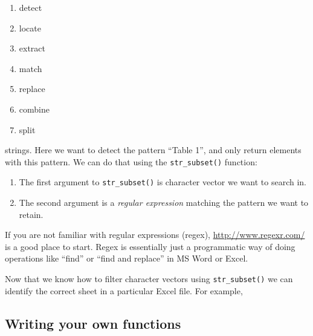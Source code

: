 \documentclass[
]{book}
\newenvironment{Shaded}{\begin{snugshade}}{\end{snugshade}}
\newcommand{\CommentTok}[1]{\textcolor[rgb]{0.56,0.35,0.01}{\textit{#1}}}
\newcommand{\DataTypeTok}[1]{\textcolor[rgb]{0.13,0.29,0.53}{#1}}
\newcommand{\DecValTok}[1]{\textcolor[rgb]{0.00,0.00,0.81}{#1}}
\newcommand{\KeywordTok}[1]{\textcolor[rgb]{0.13,0.29,0.53}{\textbf{#1}}}
\newcommand{\NormalTok}[1]{#1}
\newcommand{\OperatorTok}[1]{\textcolor[rgb]{0.81,0.36,0.00}{\textbf{#1}}}
\newcommand{\StringTok}[1]{\textcolor[rgb]{0.31,0.60,0.02}{#1}}
\providecommand{\tightlist}{%
  \setlength{\itemsep}{0pt}\setlength{\parskip}{0pt}}
\begin{document}
\begin{enumerate}
\def\labelenumi{\arabic{enumi}.}
\tightlist
\item
  detect
\item
  locate
\item
  extract
\item
  match
\item
  replace
\item
  combine
\item
  split
\end{enumerate}

strings. Here we want to detect the pattern ``Table 1'', and only
return elements with this pattern. We can do that using the
\texttt{str\_subset()} function:

\begin{enumerate}
\def\labelenumi{\arabic{enumi}.}
\tightlist
\item
  The first argument to \texttt{str\_subset()} is character vector we want to search in.
\item
  The second argument is a \emph{regular expression} matching the pattern we want to retain.
\end{enumerate}

If you are not familiar with regular expressions (regex),
\url{http://www.regexr.com/} is a good place to start. Regex is essentially
just a programmatic way of doing operations like ``find'' or ``find and replace''
in MS Word or Excel.

Now that we know how to filter character vectors using \texttt{str\_subset()} we can
identify the correct sheet in a particular Excel file. For example,

\begin{Shaded}
\end{Shaded}

\hypertarget{writing-your-own-functions}{%
\subsection{Writing your own functions}\label{writing-your-own-functions}}
\end{document}
